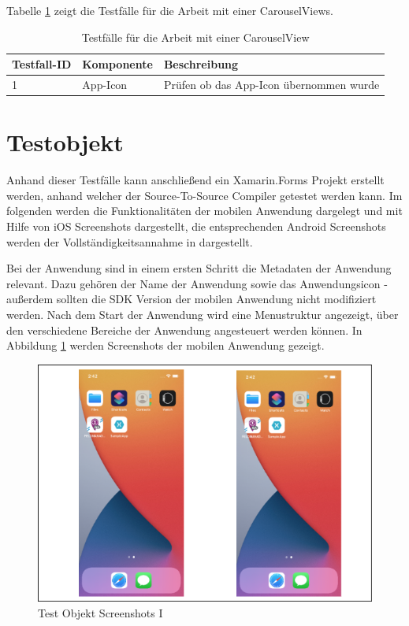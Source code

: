 Tabelle \ref{tab:Carousel} zeigt die Testfälle für die Arbeit mit einer CarouselViews. 


\begin{table}[!ht]
\begin{tabularx}{\textwidth}{l|l|X}
   \textbf{Testfall-ID} & \textbf{Komponente} & \textbf{Beschreibung} \\
\hline
1             & App-Icon           	& Prüfen ob das App-Icon übernommen wurde                      			 \\ 
\end{tabularx}
\caption{Testfälle für die Arbeit mit einer CarouselView}
 \label{tab:Carousel}
\end{table}



\section{Testobjekt}
Anhand dieser Testfälle kann anschließend ein Xamarin.Forms Projekt erstellt werden, anhand welcher der Source-To-Source Compiler getestet werden kann.  Im folgenden werden die Funktionalitäten der mobilen Anwendung dargelegt und mit Hilfe von iOS Screenshots dargestellt,  die entsprechenden Android Screenshots werden der Vollständigkeitsannahme in  dargestellt. 

Bei der Anwendung sind in einem ersten Schritt die Metadaten der Anwendung relevant.  Dazu gehören der Name der Anwendung sowie das Anwendungsicon - außerdem sollten die SDK Version der mobilen Anwendung nicht modifiziert werden. Nach dem Start der Anwendung wird eine Menustruktur angezeigt,  über den verschiedene Bereiche der Anwendung angesteuert werden können.  In Abbildung \ref{fig:TestObjectI} werden Screenshots der mobilen Anwendung gezeigt.

\begin{figure}[!ht]
 \includegraphics[width=\textwidth,keepaspectratio]{Images/Screenshot/AppIconAndMenu.png}
 \caption{Test Objekt Screenshots I}
 \label{fig:TestObjectI}
\end{figure}

